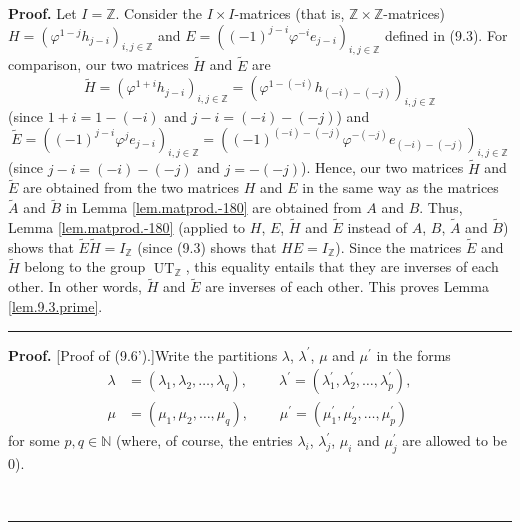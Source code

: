 \documentclass[numbers=enddot,12pt,final,onecolumn,notitlepage]{scrartcl}%
\theoremstyle{definition}
\newenvironment{proof}[1][Proof]{\noindent\textbf{#1.} }{\ \rule{0.5em}{0.5em}}
\begin{document}
\begin{enumerate}
\begin{proof}
Let $I=\mathbb{Z}$. Consider the $I\times I$-matrices (that is, $\mathbb{Z}%
\times\mathbb{Z}$-matrices) $H=\left(  \varphi^{1-j}h_{j-i}\right)
_{i,j\in\mathbb{Z}}$ and $E=\left(  \left(  -1\right)  ^{j-i}\varphi
^{-i}e_{j-i}\right)  _{i,j\in\mathbb{Z}}$ defined in (9.3). For comparison,
our two matrices $\widetilde{H}$ and $\widetilde{E}$ are%
\[
\widetilde{H}=\left(  \varphi^{1+i}h_{j-i}\right)  _{i,j\in\mathbb{Z}}=\left(
\varphi^{1-\left(  -i\right)  }h_{\left(  -i\right)  -\left(  -j\right)
}\right)  _{i,j\in\mathbb{Z}}%
\]
(since $1+i=1-\left(  -i\right)  $ and $j-i=\left(  -i\right)  -\left(
-j\right)  $) and%
\[
\widetilde{E}=\left(  \left(  -1\right)  ^{j-i}\varphi^{j}e_{j-i}\right)
_{i,j\in\mathbb{Z}}=\left(  \left(  -1\right)  ^{\left(  -i\right)  -\left(
-j\right)  }\varphi^{-\left(  -j\right)  }e_{\left(  -i\right)  -\left(
-j\right)  }\right)  _{i,j\in\mathbb{Z}}%
\]
(since $j-i=\left(  -i\right)  -\left(  -j\right)  $ and $j=-\left(
-j\right)  $). Hence, our two matrices $\widetilde{H}$ and $\widetilde{E}$ are
obtained from the two matrices $H$ and $E$ in the same way as the matrices
$\widetilde{A}$ and $\widetilde{B}$ in Lemma \ref{lem.matprod.-180} are
obtained from $A$ and $B$. Thus, Lemma \ref{lem.matprod.-180} (applied to $H$,
$E$, $\widetilde{H}$ and $\widetilde{E}$ instead of $A$, $B$, $\widetilde{A}$
and $\widetilde{B}$) shows that $\widetilde{E}\widetilde{H}=I_{\mathbb{Z}}$
(since (9.3) shows that $HE=I_{\mathbb{Z}}$). Since the matrices
$\widetilde{E}$ and $\widetilde{H}$ belong to the group $\operatorname*{UT}%
\nolimits_{\mathbb{Z}}$, this equality entails that they are inverses of each
other. In other words, $\widetilde{H}$ and $\widetilde{E}$ are inverses of
each other. This proves Lemma \ref{lem.9.3.prime}.
\end{proof}

\begin{proof}
[Proof of (9.6').]Write the partitions $\lambda$, $\lambda^{\prime}$, $\mu$
and $\mu^{\prime}$ in the forms%
\begin{align*}
\lambda &  =\left(  \lambda_{1},\lambda_{2},\ldots,\lambda_{q}\right)
,\ \ \ \ \ \ \ \ \ \ \lambda^{\prime}=\left(  \lambda_{1}^{\prime},\lambda
_{2}^{\prime},\ldots,\lambda_{p}^{\prime}\right)  ,\\
\mu &  =\left(  \mu_{1},\mu_{2},\ldots,\mu_{q}\right)
,\ \ \ \ \ \ \ \ \ \ \mu^{\prime}=\left(  \mu_{1}^{\prime},\mu_{2}^{\prime
},\ldots,\mu_{p}^{\prime}\right)
\end{align*}
for some $p,q\in\mathbb{N}$ (where, of course, the entries $\lambda_{i}$,
$\lambda_{j}^{\prime}$, $\mu_{i}$ and $\mu_{j}^{\prime}$ are allowed to be $0$).


\end{proof}
\end{enumerate}
\end{document}
